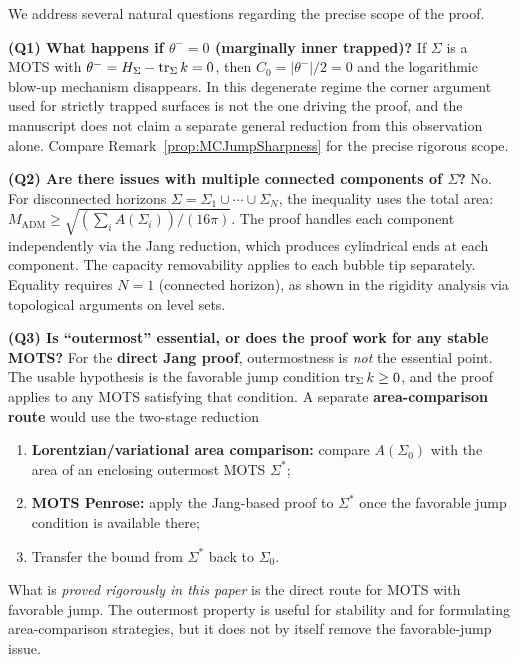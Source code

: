 \begin{remark}\label{rem:RigorFAQ}
We address several natural questions regarding the precise scope of the proof.

\textbf{(Q1) What happens if $\theta^- = 0$ (marginally inner trapped)?}
If $\Sigma$ is a MOTS with $\theta^- = H_\Sigma - \operatorname{tr}_\Sigma k = 0$, then $C_0 = |\theta^-|/2 = 0$ and the logarithmic blow-up mechanism disappears. In this degenerate regime the corner argument used for strictly trapped surfaces is not the one driving the proof, and the manuscript does not claim a separate general reduction from this observation alone. Compare Remark~\ref{prop:MCJumpSharpness} for the precise rigorous scope.

\textbf{(Q2) Are there issues with multiple connected components of $\Sigma$?}
No. For disconnected horizons $\Sigma = \Sigma_1 \cup \cdots \cup \Sigma_N$, the inequality uses the total area: $M_{\text{ADM}} \ge \sqrt{(\sum_i A(\Sigma_i))/(16\pi)}$. The proof handles each component independently via the Jang reduction, which produces cylindrical ends at each component. The capacity removability applies to each bubble tip separately. Equality requires $N = 1$ (connected horizon), as shown in the rigidity analysis via topological arguments on level sets.

\textbf{(Q3) Is ``outermost'' essential, or does the proof work for any stable MOTS?}
For the \textbf{direct Jang proof}, outermostness is \emph{not} the essential point. The usable hypothesis is the favorable jump condition $\operatorname{tr}_\Sigma k \ge 0$, and the proof applies to any MOTS satisfying that condition. A separate \textbf{area-comparison route} would use the two-stage reduction
\begin{enumerate}
    \item \textbf{Lorentzian/variational area comparison:} compare $A(\Sigma_0)$ with the area of an enclosing outermost MOTS $\Sigma^*$;
    \item \textbf{MOTS Penrose:} apply the Jang-based proof to $\Sigma^*$ once the favorable jump condition is available there;
    \item Transfer the bound from $\Sigma^*$ back to $\Sigma_0$.
\end{enumerate}
What is \emph{proved rigorously in this paper} is the direct route for MOTS with favorable jump. The outermost property is useful for stability and for formulating area-comparison strategies, but it does not by itself remove the favorable-jump issue.


\end{remark}
